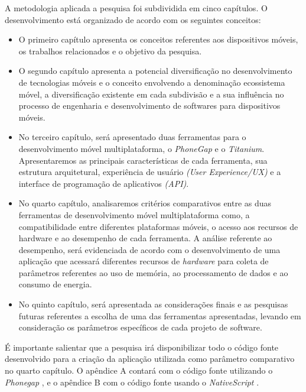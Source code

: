 A metodologia aplicada a pesquisa foi subdividida em cinco capítulos. O
desenvolvimento está organizado de acordo com os seguintes conceitos:
\begin{itemize}
  \item O primeiro capítulo apresenta os conceitos referentes
    aos dispositivos móveis, os trabalhos relacionados e o objetivo da pesquisa.
  \item O segundo capítulo apresenta a potencial diversificação no
   desenvolvimento de tecnologias móveis e o conceito envolvendo a
   denominação ecossistema móvel, a diversificação existente em cada subdivisão
   e a sua influência no processo de engenharia e desenvolvimento de softwares
   para dispositivos móveis.
  \item No terceiro capítulo, será apresentado duas ferramentas para o
   desenvolvimento móvel multiplataforma, o \textit{PhoneGap} e o
   \textit{Titanium}. Apresentaremos as principais características de cada
   ferramenta, sua estrutura arquitetural, experiência de usuário
   \textit{(User Experience/UX)} e a interface de programação de aplicativos
   \textit{(API)}.
  \item No quarto capítulo, analisaremos critérios comparativos entre as
   duas ferramentas de desenvolvimento móvel multiplataforma como, a
   compatibilidade entre diferentes plataformas móveis, o acesso aos recursos de
   hardware e ao desempenho de cada ferramenta. A análise referente ao
   desempenho, será evidenciada de acordo com o desenvolvimento de uma
   aplicação que acessará diferentes recursos de \textit{hardware} para coleta de
   parâmetros referentes ao uso de memória, ao processamento de dados e ao
   consumo de energia.
  \item No quinto capítulo, será apresentada as considerações finais e as
   pesquisas futuras referentes a escolha de uma das ferramentas apresentadas,
   levando em consideração os parâmetros específicos de cada projeto de software.
\end{itemize}

É importante salientar que a pesquisa irá disponibilizar todo o código fonte
desenvolvido para a criação da aplicação utilizada como parâmetro comparativo
no quarto capítulo. O apêndice A contará com o código fonte utilizando o \textit{Phonegap} \textsuperscript{\texttrademark}, e o apêndice B com o código
fonte usando o \textit{NativeScript} \textsuperscript{\texttrademark}.